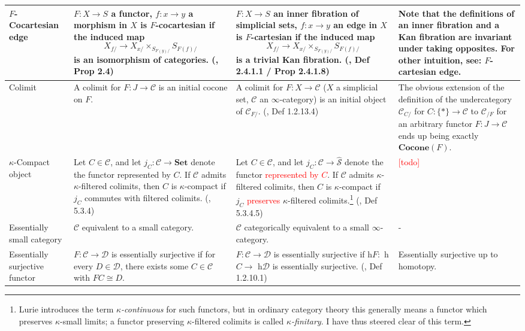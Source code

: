 \documentclass{article}
\def\textcolour{\textcolor}
\begin{document}
\begin{landscape}
\begin{centre}
\begin{longtable}{ |p{3.2cm}||p{7cm}|p{7cm}|p{8cm}|  }
 \hline
 \(F\)-Cocartesian edge & \(F : X \to S \) a functor, \(f : x\to y \) a morphism in \(X\) is \(F\)-cocartesian if the induced map \[X_{f/}\to X_{x/}\times_{S_{F(y)/}}S_{F(f)/}\] is an isomorphism of categories. (\autocite{cartesian}, Prop 2.4) & \(F : X \to S \) an inner fibration of simplicial sets, \(f : x\to y \) an edge in \(X\) is \(F\)-cartesian if the induced map \[X_{f/}\to X_{x/}\times_{S_{F(y)/}}S_{F(f)/}\] is a trivial Kan fibration. (\autocite{htt}, Def 2.4.1.1 / Prop 2.4.1.8)& Note that the definitions of an inner fibration and a Kan fibration are invariant under taking opposites. For other intuition, see: \(F\)-cartesian edge. \\
\hline
 Colimit & A colimit for \(F : J \to \mathcal{C}\) is an initial cocone on \(F\). & A colimit for \(F : X\to \mathcal{C} \) (\(X\) a simplicial set, \(\mathcal{C}\) an \(\infty\)-category) is an initial object of \(\mathcal{C}_{F/}\). (\autocite{htt}, Def 1.2.13.4) & The obvious extension of the definition of the undercategory \(\mathcal{C}_{C/}\) for \(C : \{*\} \to \mathcal{C}\) to \(\mathcal{C}_{/F}\)  for an arbitrary functor \(F : J \to \mathcal{C}\) ends up being exactly \(\textbf{Cocone}(F)\). \\
\hline
\(\kappa\)-Compact object & Let \(C \in \mathcal{C}\), and let \(j_C : \mathcal{C} \to \textbf{Set}\) denote the functor represented by \(C\). If \(\mathcal{C}\) admits \(\kappa\)-filtered colimits, then \(C\) is \(\kappa\)-compact if \(j_C\) commutes with filtered colimits. (\autocite{htt}, 5.3.4) & Let \(C \in \mathcal{C}\), and let \(j_C : \mathcal{C} \to \hat{\mathcal{S}}\) denote the functor  \textcolour{red}{represented by \(C\)}. If \(\mathcal{C}\) admits \(\kappa\)-filtered colimits, then \(C\) is \(\kappa\)-compact if \(j_C\)  \textcolour{red}{preserves} \(\kappa\)-filtered colimits.\footnote{Lurie introduces the term \textit{\(\kappa\)-continuous} for such functors, but in ordinary category theory this generally means a functor which preserves \(\kappa\)-small limits; a functor preserving \(\kappa\)-filtered colimits is called \textit{\(\kappa\)-finitary}. I have thus steered clear of this term.} (\autocite{htt}, Def 5.3.4.5) & \textcolour{red}{[todo]}\\
\hline
Essentially small category & \(\mathcal{C}\) equivalent to a small category. & \(\mathcal{C}\) categorically equivalent to a small \(\infty\)-category. \cite[\href{https://kerodon.net/tag/03SJ}{Def 03SJ}]{kerodon} & -\\
\hline 
Essentially surjective functor & \(F : \mathcal{C} \to \mathcal{D}\) is essentially surjective if for every \(D \in \mathcal{D}\), there exists some \(C \in \mathcal{C}\) with \(FC \cong D\). & \(F : \mathcal{C} \to \mathcal{D}\) is essentially surjective if h\(F :\) h\(C \to\) h\(\mathcal{D}\) is essentially surjective. (\autocite{htt}, Def 1.2.10.1) & Essentially surjective up to homotopy.\\

\end{longtable}
\end{centre}
\end{landscape}
\end{document}
